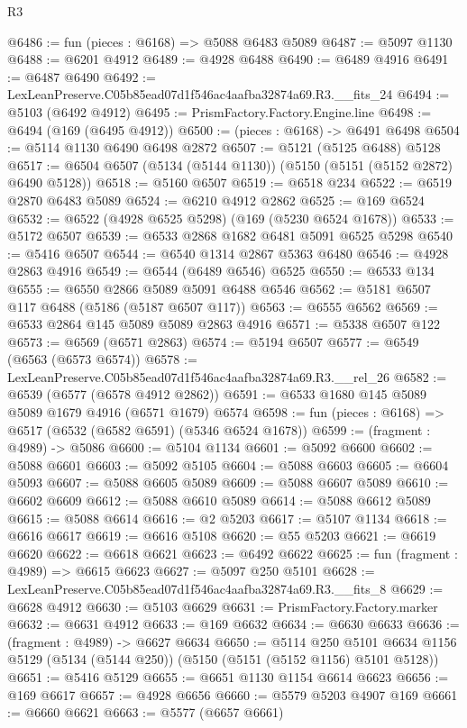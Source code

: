 \begin{lexlean}{R3}
\begin{coremodule}
@6486 := fun (pieces : @6168) => @5088 @6483 @5089
@6487 := @5097 @1130
@6488 := @6201 @4912
@6489 := @4928 @6488
@6490 := @6489 @4916
@6491 := @6487 @6490
@6492 := LexLeanPreserve.C05b85ead07d1f546ac4aafba32874a69.R3.__fits_24
@6494 := @5103 (@6492 @4912)
@6495 := PrismFactory.Factory.Engine.line
@6498 := @6494 (@169 (@6495 @4912))
@6500 := (pieces : @6168) -> @6491 @6498
@6504 := @5114 @1130 @6490 @6498 @2872
@6507 := @5121 (@5125 @6488) @5128
@6517 := @6504 @6507 (@5134 (@5144 @1130)) (@5150 (@5151 (@5152 @2872) @6490 @5128))
@6518 := @5160 @6507
@6519 := @6518 @234
@6522 := @6519 @2870 @6483 @5089
@6524 := @6210 @4912 @2862
@6525 := @169 @6524
@6532 := @6522 (@4928 @6525 @5298) (@169 (@5230 @6524 @1678))
@6533 := @5172 @6507
@6539 := @6533 @2868 @1682 @6481 @5091 @6525 @5298
@6540 := @5416 @6507
@6544 := @6540 @1314 @2867 @5363 @6480
@6546 := @4928 @2863 @4916
@6549 := @6544 (@6489 @6546) @6525
@6550 := @6533 @134
@6555 := @6550 @2866 @5089 @5091 @6488 @6546
@6562 := @5181 @6507 @117 @6488 (@5186 (@5187 @6507 @117))
@6563 := @6555 @6562
@6569 := @6533 @2864 @145 @5089 @5089 @2863 @4916
@6571 := @5338 @6507 @122
@6573 := @6569 (@6571 @2863)
@6574 := @5194 @6507
@6577 := @6549 (@6563 (@6573 @6574))
@6578 := LexLeanPreserve.C05b85ead07d1f546ac4aafba32874a69.R3.__rel_26
@6582 := @6539 (@6577 (@6578 @4912 @2862))
@6591 := @6533 @1680 @145 @5089 @5089 @1679 @4916 (@6571 @1679) @6574
@6598 := fun (pieces : @6168) => @6517 (@6532 (@6582 @6591) (@5346 @6524 @1678))
@6599 := (fragment : @4989) -> @5086
@6600 := @5104 @1134
@6601 := @5092 @6600
@6602 := @5088 @6601
@6603 := @5092 @5105
@6604 := @5088 @6603
@6605 := @6604 @5093
@6607 := @5088 @6605 @5089
@6609 := @5088 @6607 @5089
@6610 := @6602 @6609
@6612 := @5088 @6610 @5089
@6614 := @5088 @6612 @5089
@6615 := @5088 @6614
@6616 := @2 @5203
@6617 := @5107 @1134
@6618 := @6616 @6617
@6619 := @6616 @5108
@6620 := @55 @5203
@6621 := @6619 @6620
@6622 := @6618 @6621
@6623 := @6492 @6622
@6625 := fun (fragment : @4989) => @6615 @6623
@6627 := @5097 @250 @5101
@6628 := LexLeanPreserve.C05b85ead07d1f546ac4aafba32874a69.R3.__fits_8
@6629 := @6628 @4912
@6630 := @5103 @6629
@6631 := PrismFactory.Factory.marker
@6632 := @6631 @4912
@6633 := @169 @6632
@6634 := @6630 @6633
@6636 := (fragment : @4989) -> @6627 @6634
@6650 := @5114
    @250
    @5101
    @6634
    @1156
    @5129
    (@5134 (@5144 @250))
    (@5150 (@5151 (@5152 @1156) @5101 @5128))
@6651 := @5416 @5129
@6655 := @6651 @1130 @1154 @6614 @6623
@6656 := @169 @6617
@6657 := @4928 @6656
@6660 := @5579 @5203 @4907 @169
@6661 := @6660 @6621
@6663 := @5577 (@6657 @6661)

\end{coremodule}
\end{lexlean}
